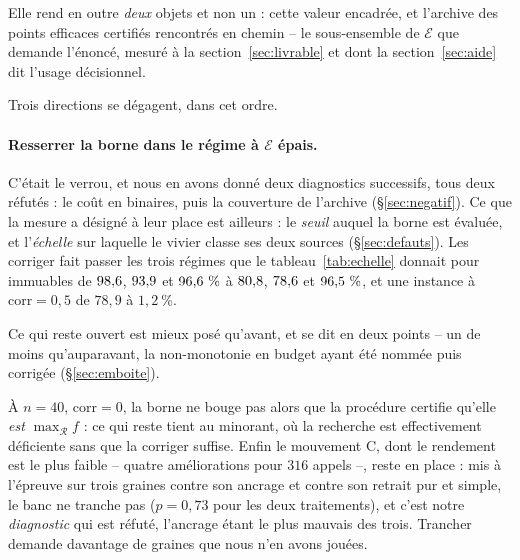 \documentclass[11pt,a4paper]{article}
\theoremstyle{plain}
\theoremstyle{remark}
\newcommand{\Ecal}{\mathcal{E}}
\newcommand{\Rcal}{\mathcal{R}}
\begin{document}
Elle rend en outre \emph{deux} objets et non un : cette valeur encadrée, et
l'archive des points efficaces certifiés rencontrés en chemin -- le
sous-ensemble de $\Ecal$ que demande l'énoncé, mesuré à la
section~\ref{sec:livrable} et dont la section~\ref{sec:aide} dit l'usage
décisionnel.

Trois directions se dégagent, dans cet ordre.

\paragraph{Resserrer la borne dans le régime à $\Ecal$ épais.} C'était le
verrou, et nous en avons donné deux diagnostics successifs, tous deux
réfutés : le coût en binaires, puis la couverture de l'archive
(§\ref{sec:negatif}). Ce que la mesure a désigné à leur place est ailleurs :
le \emph{seuil} auquel la borne est évaluée, et l'\emph{échelle} sur
laquelle le vivier classe ses deux sources (§\ref{sec:defauts}). Les corriger
fait passer les trois régimes que le tableau~\ref{tab:echelle} donnait pour
immuables de $98{,}6{}$, $93{,}9{}$ et $96{,}6{}\ \%$ à $80{,}8{}$, $78{,}6{}$ et
$96{,}5{}\ \%$, et une instance à $\text{corr}=0{,}5$ de $78{,}9$ à
$1{,}2\ \%$.

Ce qui reste ouvert est mieux posé qu'avant, et se dit en deux points --
un de moins qu'auparavant, la non-monotonie en budget ayant été nommée puis
corrigée (§\ref{sec:emboite}).

À $n=40$, $\text{corr}=0$, la borne ne bouge pas alors que la procédure
certifie qu'elle \emph{est} $\max_{\Rcal}f$ : ce qui reste tient au
minorant, où la recherche est effectivement déficiente sans que la corriger
suffise. Enfin le mouvement C, dont le rendement est le plus faible --
quatre améliorations pour $316$ appels --, reste en place : mis à l'épreuve
sur trois graines contre son ancrage et contre son retrait pur et simple, le
banc ne tranche pas ($p=0{,}73$ pour les deux traitements), et c'est notre
\emph{diagnostic} qui est réfuté, l'ancrage étant le plus mauvais des trois.
Trancher demande davantage de graines que nous n'en avons jouées.
\end{document}
